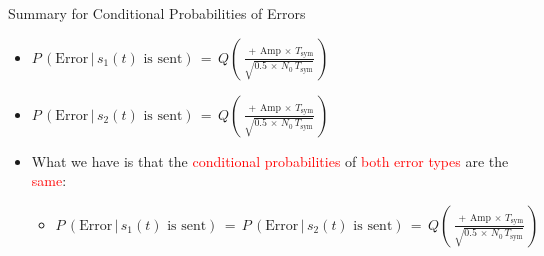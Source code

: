 \documentclass{Beamer}
\begin{document}
\begin{frame}[t]{Summary for Conditional Probabilities of Errors}

\begin{itemize}

\item $ P \, (\text{Error} \, | \, s_1(t) \text{ is sent}) \, = \, Q \left(\, \displaystyle\frac{ \, + \, \text{Amp} \, \times \, T_{\text{sym}}}{\sqrt{0.5 \, \times \, N_0 \, T_{\text{sym}}} } \, \right)$

\item  $P \, (\text{Error} \, | \, s_2(t) \text{ is sent}) \, = \, Q \left(\, \displaystyle\frac{ \, + \, \text{Amp} \, \times \, T_{\text{sym}}}{\sqrt{0.5 \, \times \, N_0 \, T_{\text{sym}}} } \, \right)$

\item What we have is that the \textcolor{red}{conditional probabilities} of \textcolor{red}{both error types} are the \textcolor{red}{same}:

	\begin{itemize}
	\item $P \, (\text{Error} \, | \, s_1(t) \text{ is sent}) \, = \, P \, (\text{Error} \, | \, s_2(t) \text{ is sent}) \, = \,  Q \left(\, \displaystyle\frac{ \, + \, \text{Amp} \, \times \, T_{\text{sym}}}{\sqrt{0.5 \, \times \, N_0 \, T_{\text{sym}}} } \, \right)$
	\end{itemize}

\end{itemize}

\end{frame}
\end{document}
